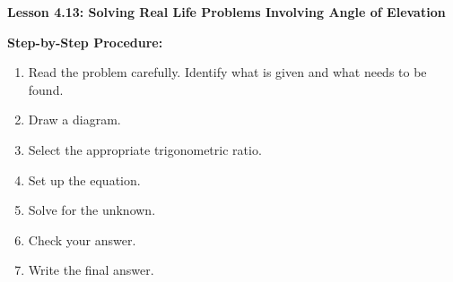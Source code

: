 \begin{center}
\textbf{Lesson 4.13: Solving Real Life Problems Involving Angle of Elevation}
\end{center}

\vspace*{-1.5ex}
\noindent\textbf{Step-by-Step Procedure:}
\begin{enumerate}
    \item Read the problem carefully. Identify what is given and what needs to be found.
    \item  Draw a diagram.
    \item  Select the appropriate trigonometric ratio. 
    \item  Set up the equation. 
    \item  Solve for the unknown. 
    \item  Check your answer. 
    \item  Write the final answer. 
    \end{enumerate}

